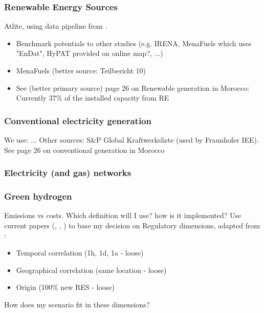 \subsubsection{Renewable Energy Sources}
Atlite, using data pipeline from \cite{Parzen2022}.

\begin{itemize}
    \item Benchmark potentials to other studies (e.g. IRENA, MenaFuels which uses "EnDat", HyPAT provided on online map?, ...)
    \item MenaFuels \cite[p. 25]{Ersoy2022} (better source: Teilbericht 10)
    \item See \cite{Ersoy2022} (better primary source) page 26 on Renewable generation in Morocco: Currently 37\% of the installed capacity from RE
\end{itemize}



\subsubsection{Conventional electricity generation}
We use: ...
Other sources: S\&P Global Kraftwerksliste (used by Fraunhofer IEE).
See \cite{Ersoy2022} page 26 on conventional generation in Morocco


\subsubsection{Electricity (and gas) networks}


\subsubsection{Green hydrogen}
Emissions vs costs. Which definition will I use? how is it implemented?
Use current papers (\cite{Brauer2022}, \cite{Ruhnau2022}, \cite{Zeyen2022a}) to base my decision on
Regulatory dimensions, adapted from \cite{Brauer2022}:
\begin{itemize}
    \item Temporal correlation (1h, 1d, 1a - loose) 
    \item Geographical correlation (same location - loose)
    \item Origin (100\% new RES - loose)
\end{itemize}
How does my scenario fit in these dimensions?

